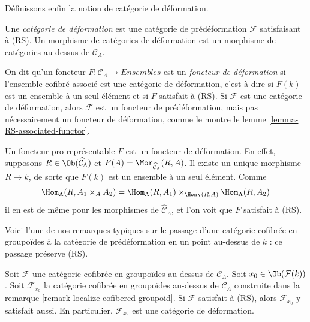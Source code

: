 \noindent
Définissons enfin la notion de catégorie de déformation.

\begin{definition}
\label{definition-deformation-category}
Une {\it catégorie de déformation} est une catégorie de prédéformation
$\mathcal{F}$ satisfaisant à (RS). Un morphisme de catégories de déformation
est un morphisme de catégories au-dessus de $\mathcal{C}_\Lambda$.
\end{definition}

\begin{remark}
\label{remark-deformation-functor}
On dit qu'un foncteur $F: \mathcal{C}_\Lambda \to \textit{Ensembles}$ est un
{\it foncteur de déformation} si l'ensemble cofibré associé est une catégorie
de déformation, c'est-à-dire si $F(k)$ est un ensemble à un seul élément et si $F$
satisfait à (RS). Si $\mathcal{F}$ est une catégorie de déformation, alors
$\overline{\mathcal{F}}$ est un foncteur de prédéformation, mais pas
nécessairement un foncteur de déformation, comme le montre le lemme
\ref{lemma-RS-associated-functor}.
\end{remark}

\begin{example}
\label{example-prorepresentable-deformation-functor}
Un foncteur pro-représentable $F$ est un foncteur de déformation. En effet,
supposons $R \in \Ob(\widehat{\mathcal{C}}_\Lambda)$ et
$F(A) = \Mor_{\widehat{\mathcal{C}}_\Lambda}(R, A)$. Il existe un unique
morphisme $R \to k$, de sorte que $F(k)$ est un ensemble à un seul élément. Comme
$$
\Hom_\Lambda(R, A_1 \times_A A_2) =
\Hom_\Lambda(R, A_1) \times_{\Hom_\Lambda(R, A)}
\Hom_\Lambda(R, A_2)
$$
il en est de même pour les morphismes de $\widehat{\mathcal{C}}_\Lambda$, et
l'on voit que $F$ satisfait à (RS).
\end{example}

\noindent
Voici l'une de nos remarques typiques sur le passage d'une catégorie cofibrée
en groupoïdes à la catégorie de prédéformation en un point au-dessus de $k$ :
ce passage préserve (RS).

\begin{lemma}
\label{lemma-localize-RS}
Soit $\mathcal{F}$ une catégorie cofibrée en groupoïdes au-dessus de
$\mathcal{C}_\Lambda$. Soit $x_0 \in \Ob(\mathcal{F}(k))$. Soit
$\mathcal{F}_{x_0}$ la catégorie cofibrée en groupoïdes au-dessus de
$\mathcal{C}_\Lambda$ construite dans la remarque
\ref{remark-localize-cofibered-groupoid}. Si $\mathcal{F}$ satisfait à (RS),
alors $\mathcal{F}_{x_0}$ y satisfait aussi. En particulier,
$\mathcal{F}_{x_0}$ est une catégorie de déformation.
\end{lemma}

